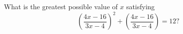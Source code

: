 What is the greatest possible value of $x$ satisfying
\[\left(\dfrac{4x-16}{3x-4}\right)^2+\left(\dfrac{4x-16}{3x-4}\right)=12?\]
